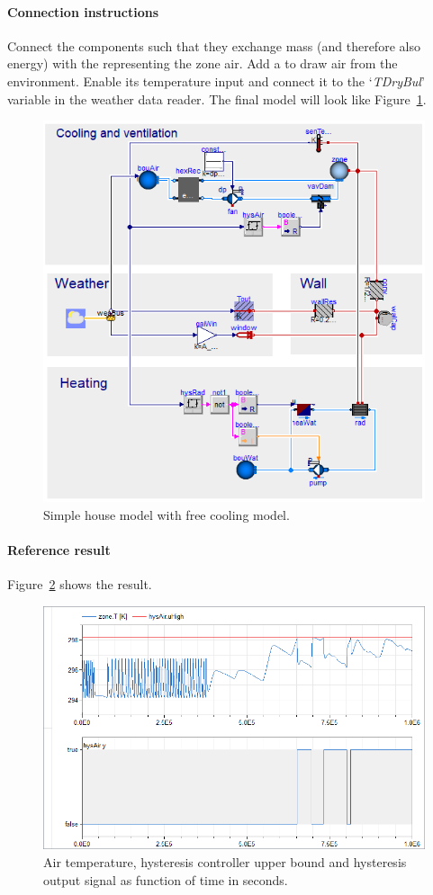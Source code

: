 \documentclass[10pt,a4paper]{article}
\begin{document}
\paragraph{Connection instructions}
Connect the components such that they exchange mass 
(and therefore also energy) with the 
representing the zone air.
Add a  to draw air from the environment.
Enable its temperature input and connect it to the `\textit{TDryBul}'
variable in the weather data reader. The final model will look like
Figure~\ref{fig:freeCoolingModel}.

\begin{figure}[h!]
\centering
\includegraphics[scale=0.65]{simpleHouse.png}
\caption{Simple house model with free cooling model.}
\label{fig:freeCoolingModel}
\end{figure} 


\paragraph{Reference result}
Figure~\ref{fig:res6} shows the result.



\begin{figure}
\centering
\includegraphics[scale=0.7]{result6.png}
\caption{Air temperature, hysteresis controller upper bound and hysteresis output signal as function of time in seconds.}
\label{fig:res6}
\end{figure}
\end{document}
